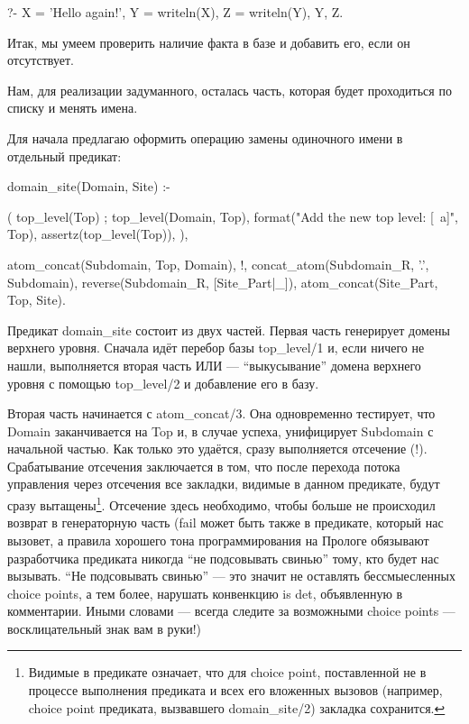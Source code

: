 \documentclass[a4paper]{book}
\begin{document}
\begin{example}{}{}
?- X = 'Hello again!',
   Y = writeln(X), Z = writeln(Y), 
   Y, Z.
\end{example}

Итак, мы умеем проверить наличие факта в базе и добавить его,
если он отсутствует.

Нам, для реализации задуманного, осталась часть, которая будет
проходиться по списку и менять имена.

Для начала предлагаю оформить операцию замены одиночного имени в
отдельный предикат:

\begin{example}{}{}
domain_site(Domain, Site) :-

  (
      top_level(Top)
  ;
      top_level(Domain, Top),
      format("Add the new top level: [~a]\n", Top),
      assertz(top_level(Top)),
   ),

   atom_concat(Subdomain, Top, Domain), !,
   concat_atom(Subdomain_R, '.', Subdomain),
   reverse(Subdomain_R, [Site_Part|_]),
   atom_concat(Site_Part, Top, Site).
\end{example}

Предикат domain_site состоит из двух частей. Первая часть
генерирует домены верхнего уровня. Сначала идёт перебор базы
top_level/1 и, если ничего не нашли, выполняется вторая часть ИЛИ
--- ``выкусывание'' домена верхнего уровня с помощью top_level/2
и добавление его в базу.

Вторая часть начинается с atom_concat/3. Она одновременно
тестирует, что Domain заканчивается на Top и, в случае успеха,
унифицирует Subdomain с начальной частью. Как только это удаётся,
сразу выполняется отсечение (!). Срабатывание отсечения
заключается в том, что после перехода потока управления через
отсечения все закладки, видимые в данном предикате, будут сразу
вытащены\footnote{Видимые в предикате означает, что для choice
  point, поставленной не в процессе выполнения предиката и всех
  его вложенных вызовов (например, choice point предиката,
  вызвавшего domain_site/2) закладка сохранится.}. Отсечение
здесь необходимо, чтобы больше не происходил возврат в
генераторную часть (fail может быть также в предикате, который
нас вызовет, а правила хорошего тона программирования на Прологе
обязывают разработчика предиката никогда ``не подсовывать
свинью'' тому, кто будет нас вызывать. ``Не подсовывать свинью''
--- это значит не оставлять бессмыесленных choice points, а тем
более, нарушать конвенкцию is det, объявленную в
комментарии. Иными словами --- всегда следите за возможными
choice points --- восклицательный знак вам в руки!)
\end{document}
